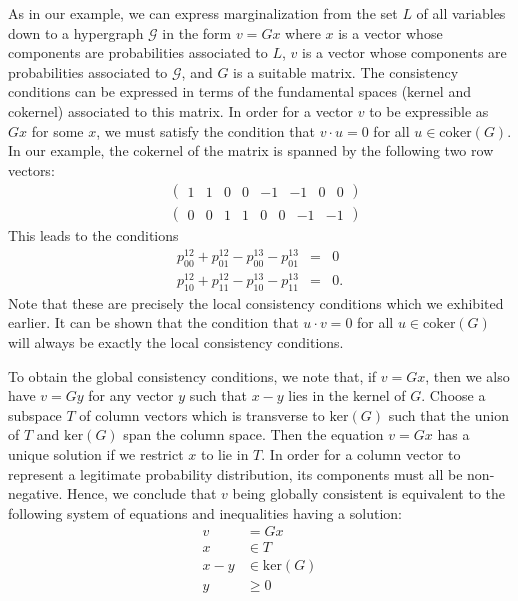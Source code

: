 As in our example, we can express marginalization from the set $L$ of
all variables down to a hypergraph $\mathcal{G}$ in the form $v = Gx$
where $x$ is a vector whose components are probabilities associated to
$L$, $v$ is a vector whose components are probabilities associated to
$\mathcal {G}$, and $G$ is a suitable matrix.  The consistency
conditions can be expressed in terms of the fundamental spaces (kernel
and cokernel) associated to this matrix.  In order for a vector $v$ to
be expressible as $Gx$ for some $x$, we must satisfy the condition
that $v\cdot u = 0$ for all $u \in \mathrm{coker} (G)$.  In our
example, the cokernel of the matrix is spanned by the following two
row vectors:
\begin{eqnarray}
 &\begin{pmatrix}
  1 & 1 & 0 & 0 & -1 & -1 & 0 & 0
 \end{pmatrix}\\
 &\begin{pmatrix}
 0 & 0 & 1 & 1 & 0 & 0 & -1 & -1
 \end{pmatrix}
\end{eqnarray}
This leads to the conditions
\begin{eqnarray}
 p^{12}_{00} + p^{12}_{01} - p^{13}_{00} - p^{13}_{01} &=& 0 \\
 p^{12}_{10} + p^{12}_{11} - p^{13}_{10} - p^{13}_{11} &=& 0 .
\end{eqnarray}
Note that these are precisely the local consistency conditions which we
exhibited earlier.  It can be shown that the condition that $u \cdot v
= 0$ for all $u \in \mathrm{coker} (G)$ will always be exactly the
local consistency conditions.

To obtain the global consistency conditions, we note that, if $v =
Gx$, then we also have $v = Gy$ for any vector $y$ such that $x-y$
lies in the kernel of $G$.  Choose a subspace $T$ of column vectors
which is transverse to $\mathrm{ker}(G)$ such that the union of $T$
and $\mathrm{ker}(G)$ span the column space.  Then the equation $v =
Gx$ has a unique solution if we restrict $x$ to lie in $T$.  In order
for a column vector to represent a legitimate probability
distribution, its components must all be non-negative.  Hence, we
conclude that $v$ being globally consistent is equivalent to the
following system of equations and inequalities having a solution:
\begin{equation}
\begin{aligned}\label{eq:globalconsistencyconditions}
 v &= Gx \\
 x &\in T \\
 x - y &\in \mathrm{ker}(G) \\
 y &\ge 0
\end{aligned}
\end{equation}

